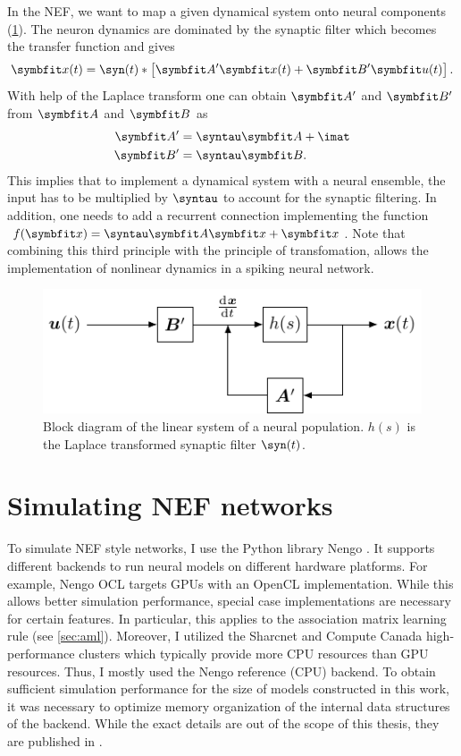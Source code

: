 In the NEF, we want to map a given dynamical system onto neural components (\cref{fig:neural-lti}).
The neuron dynamics are dominated by the synaptic filter \parencite[Appendix~F.1]{eliasmith2003} which becomes the transfer function and gives
\begin{equation}
    \vc x(t) = \syn(t) * \sbr{\mat A' \vc x(t) + \mat B' \vc u(t)} \text{.}
\end{equation}
With help of the Laplace transform one can obtain $\mat A'$ and $\mat B'$ from $\mat A$ and $\mat B$ as
\begin{align}
    \mat A' &= \syntau \mat A + \imat \\
    \mat B' &= \syntau \mat B  \text{.}
\end{align}
This implies that to implement a dynamical system with a neural ensemble, the input has to be multiplied by $\syntau$ to account for the synaptic filtering.
In addition, one needs to add a recurrent connection implementing the function $f(\vc x) = \syntau \mat A \vc x + \vc x$.
Note that combining this third principle with the principle of transfomation, allows the implementation of nonlinear dynamics in a spiking neural network.
\begin{figure}
    \centering
    \includegraphics{tikz/neural-lti}
    \caption[Block diagram of the linear system of a neural population.]{Block diagram of the linear system of a neural population. $h(s)$ is the Laplace transformed synaptic filter $\syn(t)$.}\label{fig:neural-lti}
\end{figure}


\section{Simulating NEF networks}
To simulate NEF style networks, I use the Python library Nengo \parencite{bekolay2014,sharma2016}.
It supports different backends to run neural models on different hardware platforms.
For example, Nengo OCL targets GPUs with an OpenCL implementation.
While this allows better simulation performance, special case implementations are necessary for certain features.
In particular, this applies to the association matrix learning rule (see \cref{sec:aml}).
Moreover, I utilized the Sharcnet and Compute Canada high-performance clusters which typically provide more CPU resources than GPU resources.
Thus, I mostly used the Nengo reference (CPU) backend.
To obtain sufficient simulation performance for the size of models constructed in this work, it was necessary to optimize memory organization of the internal data structures of the backend.
While the exact details are out of the scope of this thesis, they are published in \textcite{gosmann2017}.
